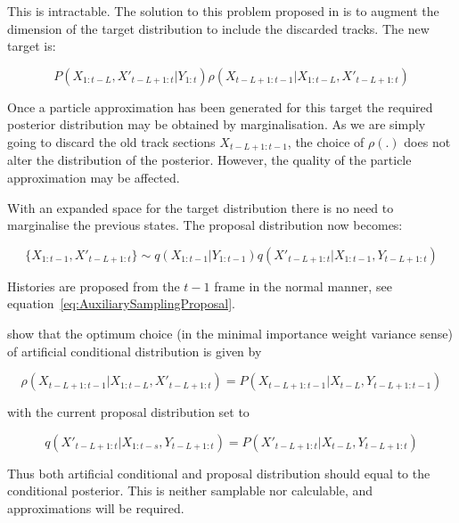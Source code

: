 This is intractable. The solution to this problem proposed in \cite{Doucet2006} is to augment the dimension of the target distribution to include the discarded tracks. The new target is:

\begin{equation}
P(X_{1:t-L}, X'_{t-L+1:t}|Y_{1:t}) \rho(X_{t-L+1:t-1}|X_{1:t-L}, X'_{t-L+1:t})
\label{eq:FLTarget}
\end{equation}

Once a particle approximation has been generated for this target the required posterior distribution may be obtained by marginalisation. As we are simply going to discard the old track sections $X_{t-L+1:t-1}$, the choice of $\rho(.)$ does not alter the distribution of the posterior. However, the quality of the particle approximation may be affected.

With an expanded space for the target distribution there is no need to marginalise the previous states. The proposal distribution now becomes:

\begin{equation}
\{X_{1:t-1}, X'_{t-L+1:t}\} \sim q(X_{1:t-1}|Y_{1:t-1}) q(X'_{t-L+1:t}|X_{1:t-1}, Y_{t-L+1:t})
\label{eq:ExtendedFLProposal}
\end{equation}

Histories are proposed from the $t-1$ frame in the normal manner, see equation~\ref{eq:AuxiliarySamplingProposal}.

\cite{Doucet2006} show that the optimum choice (in the minimal importance weight variance sense) of artificial conditional distribution is given by 

\begin{equation}
\rho(X_{t-L+1:t-1}|X_{1:t-L}, X'_{t-L+1:t}) = P(X_{t-L+1:t-1}|X_{t-L}, Y_{t-L+1:t-1})
\label{eq:}
\end{equation}

with the current proposal distribution set to

\begin{equation}
q(X'_{t-L+1:t}|X_{1:t-s}, Y_{t-L+1:t}) = P(X'_{t-L+1:t}|X_{t-L}, Y_{t-L+1:t})
\label{eq:}
\end{equation}

Thus both artificial conditional and proposal distribution should equal to the conditional posterior. This is neither samplable nor calculable, and approximations will be required.